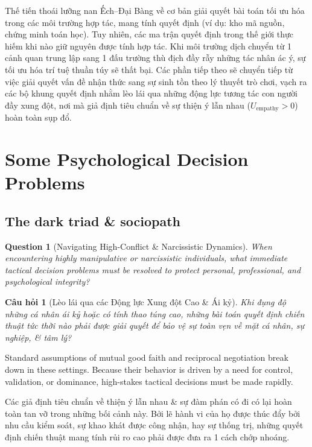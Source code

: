 \documentclass{article}
\newtheorem{question}{Question}
\newtheorem{cauhoi}{Câu hỏi}
\begin{document}
Thế tiến thoái lưỡng nan Ếch--Đại Bàng về cơ bản giải quyết bài toán tối ưu hóa trong các môi trường hợp tác, mang tính quyết định (ví dụ: kho mã nguồn, chứng minh toán học). Tuy nhiên, các ma trận quyết định trong thế giới thực hiếm khi nào giữ nguyên được tính hợp tác. Khi môi trường dịch chuyển từ 1 cảnh quan trung lập sang 1 đấu trường thù địch đầy rẫy những tác nhân ác ý, sự tối ưu hóa trí tuệ thuần túy sẽ thất bại. Các phần tiếp theo sẽ chuyển tiếp từ việc giải quyết vấn đề nhận thức sang sự sinh tồn theo lý thuyết trò chơi, vạch ra các bộ khung quyết định nhằm lèo lái qua những động lực tương tác con người đầy xung đột, nơi mà giả định tiêu chuẩn về sự thiện ý lẫn nhau ($U_{\text{empathy}} > 0$) hoàn toàn sụp đổ.

\section{Some Psychological Decision Problems}

\subsection{The dark triad \& sociopath}

\begin{question}[Navigating High-Conflict \& Narcissistic Dynamics]
	When encountering highly manipulative or narcissistic individuals, what immediate tactical decision problems must be resolved to protect personal, professional, and psychological integrity?
\end{question}
\begin{cauhoi}[Lèo lái qua các Động lực Xung đột Cao \& Ái kỷ]
	Khi đụng độ những cá nhân ái kỷ hoặc có tính thao túng cao, những bài toán quyết định chiến thuật tức thời nào phải được giải quyết để bảo vệ sự toàn vẹn về mặt cá nhân, sự nghiệp, \& tâm lý?
\end{cauhoi}

Standard assumptions of mutual good faith and reciprocal negotiation break down in these settings. Because their behavior is driven by a need for control, validation, or dominance, high-stakes tactical decisions must be made rapidly.

Các giả định tiêu chuẩn về thiện ý lẫn nhau \& sự đàm phán có đi có lại hoàn toàn tan vỡ trong những bối cảnh này. Bởi lẽ hành vi của họ được thúc đẩy bởi nhu cầu kiểm soát, sự khao khát được công nhận, hay sự thống trị, những quyết định chiến thuật mang tính rủi ro cao phải được đưa ra 1 cách chớp nhoáng.
\end{document}
